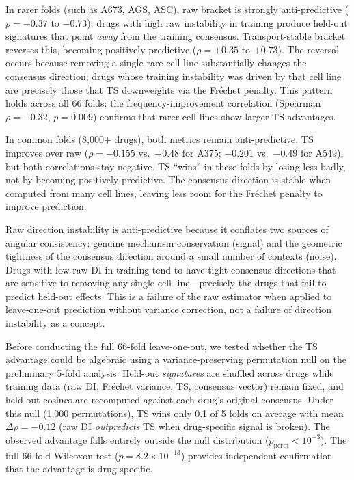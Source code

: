 \documentclass[11pt]{article}
\begin{document}
In rarer folds (such as A673, AGS, ASC), raw bracket is strongly
anti-predictive ($\rho = -0.37$ to $-0.73$): drugs with high raw
instability in training produce held-out signatures that point
\emph{away} from the training consensus. Transport-stable bracket
reverses this, becoming positively predictive ($\rho = +0.35$ to
$+0.73$). The reversal occurs because removing a single rare cell
line substantially changes the consensus direction; drugs whose
training instability was driven by that cell line are precisely those
that TS downweights via the Fr\'{e}chet penalty. This pattern holds
across all 66 folds: the frequency-improvement correlation (Spearman
$\rho = -0.32$, $p = 0.009$) confirms that rarer cell lines show
larger TS advantages.

In common folds (8{,}000+ drugs), both metrics remain
anti-predictive. TS improves over raw ($\rho = -0.155$ vs.\ $-0.48$ for
A375; $-0.201$ vs.\ $-0.49$ for A549), but both correlations stay
negative. TS ``wins'' in these folds by losing less badly, not by becoming
positively predictive. The consensus direction is stable when computed from
many cell lines, leaving less room for the Fr\'{e}chet penalty to
improve prediction.

Raw direction instability is anti-predictive because it conflates two
sources of angular consistency: genuine mechanism conservation (signal)
and the geometric tightness of the consensus direction around a small
number of contexts (noise). Drugs with low raw DI in training tend to
have tight consensus directions that are sensitive to removing any single
cell line---precisely the drugs that fail to predict held-out effects.
This is a failure of the raw estimator when applied to leave-one-out
prediction without variance correction, not a failure of direction
instability as a concept.

Before conducting the full 66-fold leave-one-out, we tested whether the
TS advantage could be algebraic using a variance-preserving permutation
null on the preliminary 5-fold analysis. Held-out
\emph{signatures} are shuffled across drugs while training data
(raw DI, Fr\'echet variance, TS, consensus vector) remain fixed,
and held-out cosines are recomputed against each drug's original
consensus. Under this null (1{,}000 permutations),
TS wins only 0.1 of 5 folds on average with mean $\Delta\rho = -0.12$
(raw DI \emph{outpredicts} TS when drug-specific signal is broken).
The observed advantage falls entirely outside the null distribution
($p_{\text{perm}} < 10^{-3}$). The full 66-fold Wilcoxon test
($p = 8.2 \times 10^{-13}$) provides independent confirmation that the
advantage is drug-specific.
\end{document}
